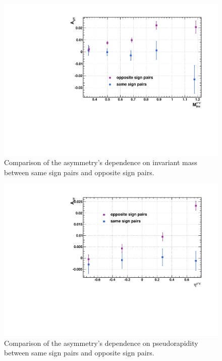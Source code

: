 \documentclass[abstract = on,listof=totoc, bibliography=totoc]{scrreprt}
\begin{document}
\begin{figure}
\begin{center}
\includegraphics[width = .7\textwidth]{asymVsMass_SameOpp}
\caption[comparison of $M_{inv}$ asymmetry between same sign and opposite sign pairs]{Comparison of the asymmetry's dependence on invariant mass between same sign pairs and opposite sign pairs.}
\label{fig:samesignMass}
\end{center}
\end{figure}

\begin{figure}
\begin{center}
\includegraphics[width = .7\textwidth]{asymVsEta_SameOpp}
\caption[comparison of $\eta$ asymmetry between same sign and opposite sign pairs]{Comparison of the asymmetry's dependence on pseudorapidity between same sign pairs and opposite sign pairs.}
\label{fig:samesignEta}
\end{center}
\end{figure}
\end{document}
